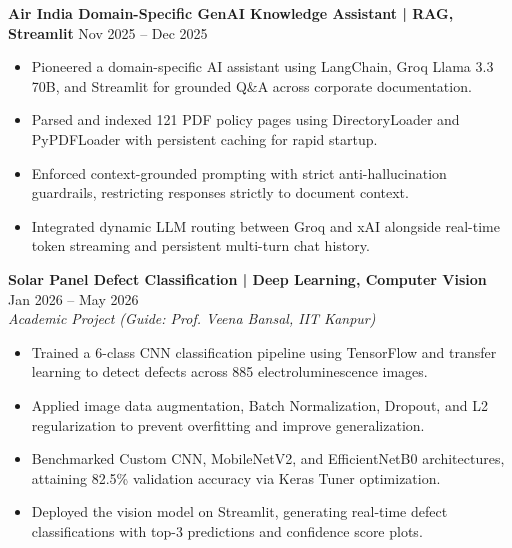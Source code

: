 \documentclass[10pt]{article}
\begin{document}
\textbf{Air India Domain-Specific GenAI Knowledge Assistant | RAG, Streamlit} \hfill Nov 2025 -- Dec 2025
\begin{itemize}[noitemsep, topsep=2pt, partopsep=0pt, parsep=1.5pt]
    \item Pioneered a domain-specific AI assistant using LangChain, Groq Llama 3.3 70B, and Streamlit for grounded Q\&A across corporate documentation.
    \item Parsed and indexed 121 PDF policy pages using DirectoryLoader and PyPDFLoader with persistent caching for rapid startup.
    \item Enforced context-grounded prompting with strict anti-hallucination guardrails, restricting responses strictly to document context.
    \item Integrated dynamic LLM routing between Groq and xAI alongside real-time token streaming and persistent multi-turn chat history.
\end{itemize}

\vspace{6pt}

\textbf{Solar Panel Defect Classification | Deep Learning, Computer Vision} \hfill Jan 2026 -- May 2026\\
\textit{Academic Project (Guide: Prof. Veena Bansal, IIT Kanpur)}
\begin{itemize}[noitemsep, topsep=2pt, partopsep=0pt, parsep=1.5pt]
    \item Trained a 6-class CNN classification pipeline using TensorFlow and transfer learning to detect defects across 885 electroluminescence images.
    \item Applied image data augmentation, Batch Normalization, Dropout, and L2 regularization to prevent overfitting and improve generalization.
    \item Benchmarked Custom CNN, MobileNetV2, and EfficientNetB0 architectures, attaining 82.5\% validation accuracy via Keras Tuner optimization.
    \item Deployed the vision model on Streamlit, generating real-time defect classifications with top-3 predictions and confidence score plots.
\end{itemize}

\vspace{6pt}
\end{document}
